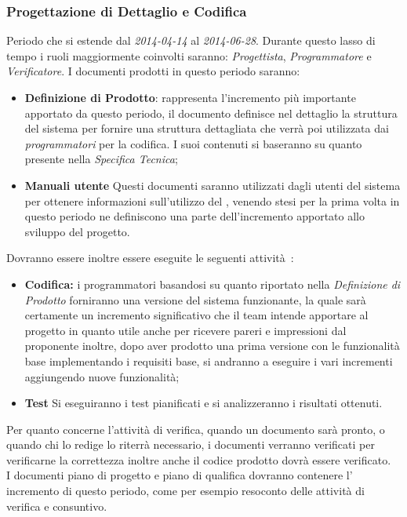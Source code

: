 \subsubsection{Progettazione di Dettaglio e Codifica}
Periodo che si estende dal \textit{2014-04-14} al \textit{2014-06-28}. Durante questo lasso di tempo i ruoli maggiormente coinvolti saranno: \textit{Progettista}, \textit{Programmatore} e \textit{Verificatore}. I documenti prodotti in questo periodo saranno:
\begin{itemize}
	\item \textbf{Definizione di Prodotto}: rappresenta l'incremento più importante apportato da questo periodo, il documento definisce nel dettaglio la struttura del sistema per fornire una struttura dettagliata che verrà poi utilizzata dai \textit{programmatori} per la codifica. I suoi contenuti si baseranno su quanto presente nella \textit{Specifica Tecnica};
	\item \textbf{Manuali utente} Questi documenti saranno utilizzati dagli utenti del sistema per ottenere informazioni sull'utilizzo del \progetto , venendo stesi per la prima volta in questo periodo ne definiscono una parte dell'incremento apportato allo sviluppo del progetto.
\end{itemize}
Dovranno essere inoltre essere eseguite le seguenti attività~:
\begin{itemize}
\item \textbf{Codifica:} i programmatori basandosi su quanto riportato nella \textit{Definizione di Prodotto} forniranno una versione del sistema funzionante, la quale sarà certamente un incremento significativo che il team intende apportare al progetto in quanto utile anche per ricevere pareri e impressioni dal proponente inoltre, dopo aver prodotto una prima versione con le funzionalità base implementando i requisiti base, si andranno a eseguire i vari incrementi aggiungendo nuove funzionalità;
\item \textbf{Test} Si eseguiranno i test pianificati e si analizzeranno i risultati ottenuti.
\end{itemize}
Per quanto concerne l'attività di verifica, quando un documento sarà pronto, o quando chi lo redige lo riterrà necessario, i documenti verranno verificati per verificarne la correttezza inoltre anche il codice prodotto dovrà essere verificato.\\
I documenti piano di progetto e piano di qualifica dovranno contenere l' incremento di questo periodo, come per esempio resoconto delle attività di verifica e consuntivo.
